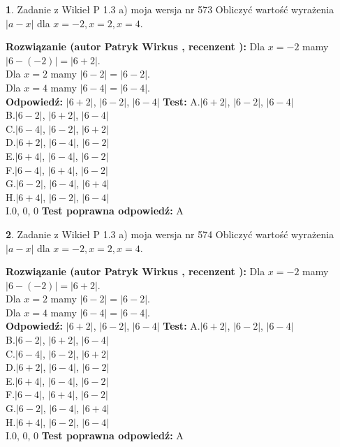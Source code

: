 \documentclass[12pt, a4paper]{article}
\theoremstyle{definition} %
\newtheorem{zad}{}
\newcommand{\zadStart}[1]{\begin{zad}#1\newline}
\newcommand{\zadStop}{\end{zad}}
\newcommand{\rozwStart}[2]{\noindent \textbf{Rozwiązanie (autor #1 , recenzent #2): }\newline}
\newcommand{\rozwStop}{\newline}
\newcommand{\odpStart}{\noindent \textbf{Odpowiedź:}\newline}
\newcommand{\odpStop}{\newline}
\newcommand{\testStart}{\noindent \textbf{Test:}\newline}
\newcommand{\testStop}{\newline}
\newcommand{\kluczStart}{\noindent \textbf{Test poprawna odpowiedź:}\newline}
\newcommand{\kluczStop}{\newline}
\begin{document}
\zadStart{Zadanie z Wikieł P 1.3 a) moja wersja nr 573}
Obliczyć wartość wyrażenia $|a - x|$ dla $x=-2,x=2,x=4$.
\zadStop
\rozwStart{Patryk Wirkus}{}
Dla $x = -2$ mamy $|6 - (-2)| = |6 + 2|$.\\
Dla $x = 2$ mamy $|6 - 2| = |6 - 2|$.\\
Dla $x = 4$ mamy $|6 - 4| = |6 - 4|$.\\
\rozwStop
\odpStart
$|6 + 2|$, $|6 - 2|$, $|6 - 4|$
\odpStop
\testStart
A.$|6 + 2|$, $|6 - 2|$, $|6 - 4|$\\
B.$|6 - 2|$, $|6 + 2|$, $|6 - 4|$\\
C.$|6 - 4|$, $|6 - 2|$, $|6 + 2|$\\
D.$|6 + 2|$, $|6 - 4|$, $|6 - 2|$\\
E.$|6 + 4|$, $|6 - 4|$, $|6 - 2|$\\
F.$|6 - 4|$, $|6 + 4|$, $|6 - 2|$\\
G.$|6 - 2|$, $|6 - 4|$, $|6 + 4|$\\
H.$|6 + 4|$, $|6 - 2|$, $|6 - 4|$\\
I.$0$, $0$, $0$
\testStop
\kluczStart
A
\kluczStop



\zadStart{Zadanie z Wikieł P 1.3 a) moja wersja nr 574}
Obliczyć wartość wyrażenia $|a - x|$ dla $x=-2,x=2,x=4$.
\zadStop
\rozwStart{Patryk Wirkus}{}
Dla $x = -2$ mamy $|6 - (-2)| = |6 + 2|$.\\
Dla $x = 2$ mamy $|6 - 2| = |6 - 2|$.\\
Dla $x = 4$ mamy $|6 - 4| = |6 - 4|$.\\
\rozwStop
\odpStart
$|6 + 2|$, $|6 - 2|$, $|6 - 4|$
\odpStop
\testStart
A.$|6 + 2|$, $|6 - 2|$, $|6 - 4|$\\
B.$|6 - 2|$, $|6 + 2|$, $|6 - 4|$\\
C.$|6 - 4|$, $|6 - 2|$, $|6 + 2|$\\
D.$|6 + 2|$, $|6 - 4|$, $|6 - 2|$\\
E.$|6 + 4|$, $|6 - 4|$, $|6 - 2|$\\
F.$|6 - 4|$, $|6 + 4|$, $|6 - 2|$\\
G.$|6 - 2|$, $|6 - 4|$, $|6 + 4|$\\
H.$|6 + 4|$, $|6 - 2|$, $|6 - 4|$\\
I.$0$, $0$, $0$
\testStop
\kluczStart
A
\kluczStop
\end{document}
